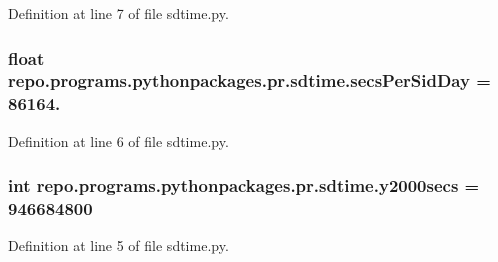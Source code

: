 Definition at line 7 of file sdtime.\-py.

\hypertarget{namespacerepo_1_1programs_1_1pythonpackages_1_1pr_1_1sdtime_ac9d3c2155d402d7c140fe3247e1f5722}{
\subsubsection[{secs\-Per\-Sid\-Day}]{\setlength{\rightskip}{0pt plus 5cm}float repo.\-programs.\-pythonpackages.\-pr.\-sdtime.\-secs\-Per\-Sid\-Day = 86164.}}\label{namespacerepo_1_1programs_1_1pythonpackages_1_1pr_1_1sdtime_ac9d3c2155d402d7c140fe3247e1f5722}


Definition at line 6 of file sdtime.\-py.

\hypertarget{namespacerepo_1_1programs_1_1pythonpackages_1_1pr_1_1sdtime_ad0dcc84eadafdd803d57e73ef2c6e4a2}{
\subsubsection[{y2000secs}]{\setlength{\rightskip}{0pt plus 5cm}int repo.\-programs.\-pythonpackages.\-pr.\-sdtime.\-y2000secs = 946684800}}\label{namespacerepo_1_1programs_1_1pythonpackages_1_1pr_1_1sdtime_ad0dcc84eadafdd803d57e73ef2c6e4a2}


Definition at line 5 of file sdtime.\-py.

